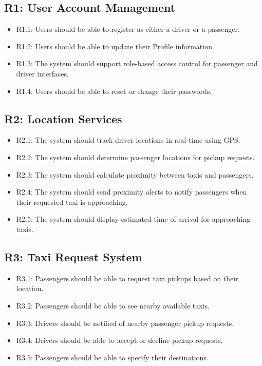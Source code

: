 \documentclass[a4paper,12pt]{article}
\begin{document}
\subsection*{R1: User Account Management}
\begin{itemize}
    \item R1.1: Users should be able to register as either a driver or a passenger.
    \item R1.2: Users should be able to update their Profile information.
    \item R1.3: The system should support role-based access control for passenger and driver interfaces.
    \item R1.4: Users should be able to reset or change their passwords.
\end{itemize}

\subsection*{R2: Location Services}
\begin{itemize}
    \item R2.1: The system should track driver locations in real-time using GPS.
    \item R2.2: The system should determine passenger locations for pickup requests.
    \item R2.3: The system should calculate proximity between taxis and passengers.
    \item R2.4: The system should send proximity alerts to notify passengers when their requested taxi is approaching.
    \item R2.5: The system should display estimated time of arrival for approaching taxis.
\end{itemize}

\subsection*{R3: Taxi Request System}
\begin{itemize}
    \item R3.1: Passengers should be able to request taxi pickups based on their location.
    \item R3.2: Passengers should be able to see nearby available taxis.
    \item R3.3: Drivers should be notified of nearby passenger pickup requests.
    \item R3.4: Drivers should be able to accept or decline pickup requests.
    \item R3.5: Passengers should be able to specify their destinations.
\end{itemize}
\end{document}
